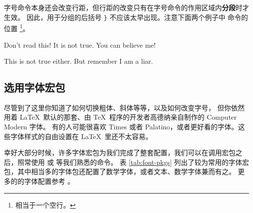 字号命令本身还会改变行距，但行距的改变只有在字号命令的作用区域内\textbf{分段}时才生效。
因此，用于分组的后括号 \texttt\} 不应该太早出现。注意下面两个例子中 命令的位置%
\footnote{ 相当于一个空行。}。

\begin{example}
{\Large Don't read this!
 It is not true.
 You can believe me!\par}
\end{example}

\begin{example}
{\Large This is not true either.
But remember I am a liar.}\par
\end{example}

\subsection{选用字体宏包}

尽管到了这里你知道了如何切换粗体、斜体等等，以及如何改变字号，
但你依然用着 \LaTeX\ 默认的那套、由 \TeX\ 程序的开发者高德纳亲自制作的 Computer Modern 字体。
有的人可能很喜欢 Times 或者 Palatino，或者更好看的字体。这些字体样式的自由设置在 \LaTeX\ 里还不太容易。

幸好大部分时候，许多字体宏包为我们完成了整套配置，我们可以在调用宏包之后，照常使用  或  等我们熟悉的命令。
表 \ref{tab:font-pkgs} 列出了较为常用的字体宏包，其中相当多的字体包还配置了数学字体，或者文本、数学字体兼而有之。
更多的的字体配置参考 \cite{survey,fontcatalogue}。

